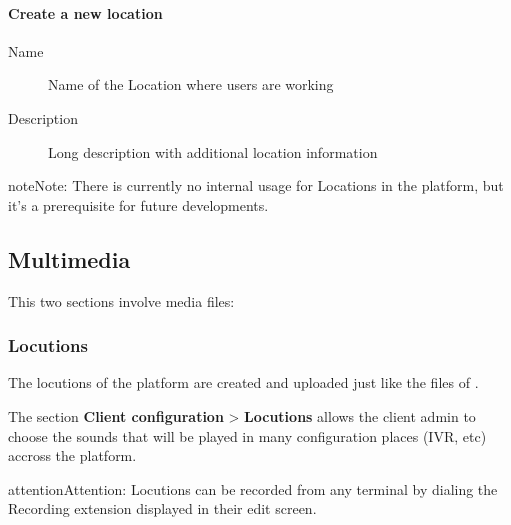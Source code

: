 \documentclass[letterpaper,10pt,english]{sphinxmanual}
\begin{document}
\paragraph{Create a new location}
\begin{description}
\item[{Name}] \leavevmode{}\label{administration_portal/client/vpbx/user_configuration/locations:term-name}
Name of the Location where users are working

\item[{Description}] \leavevmode{}\label{administration_portal/client/vpbx/user_configuration/locations:term-description}
Long description with additional location information

\end{description}

\begin{notice}{note}{Note:}
There is currently no internal usage for Locations in the
platform, but it's a prerequisite for future developments.
\end{notice}


\subsection{Multimedia}
\label{administration_portal/client/vpbx/multimedia/index:multimedia}\label{administration_portal/client/vpbx/multimedia/index::doc}
This two sections involve media files:


\subsubsection{Locutions}
\label{administration_portal/client/vpbx/multimedia/locutions:locutions}\label{administration_portal/client/vpbx/multimedia/locutions::doc}
The locutions of the platform are created and uploaded just like the files of
{\hyperref[administration_portal/client/vpbx/multimedia/music_on_hold:musiconhold]{}}.

The section \textbf{Client configuration} \textgreater{} \textbf{Locutions}  allows the client admin
to choose the sounds that will be played in many configuration places (IVR, etc)
accross the platform.

\begin{notice}{attention}{Attention:}
Locutions can be recorded from any terminal by dialing the
Recording extension displayed in their edit screen.
\end{notice}
\end{document}
